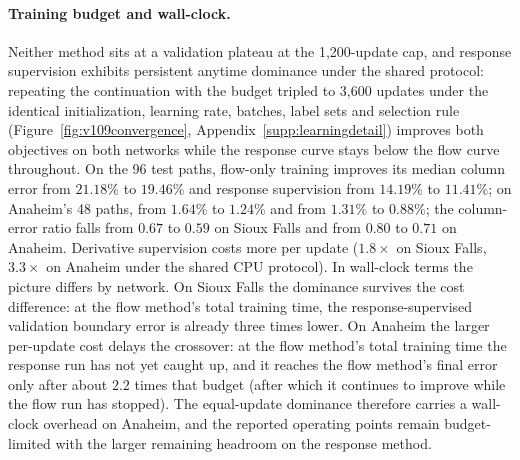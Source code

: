 \paragraph{Training budget and wall-clock.}
Neither method sits at a validation plateau at the 1{,}200-update cap,
and response supervision exhibits persistent anytime dominance under
the shared protocol: repeating the continuation with the budget
tripled to 3{,}600 updates under the identical initialization,
learning rate, batches, label sets and selection rule
(Figure~\ref{fig:v109convergence}, Appendix~\ref{supp:learningdetail})
improves both objectives on both networks while the response curve
stays below the flow curve throughout. On the 96 test paths, flow-only
training improves its median column error from $21.18\%$ to $19.46\%$
and response supervision from $14.19\%$ to $11.41\%$; on Anaheim's 48
paths, from $1.64\%$ to $1.24\%$ and from $1.31\%$ to $0.88\%$; the
column-error ratio falls from $0.67$ to $0.59$ on Sioux Falls and from
$0.80$ to $0.71$ on Anaheim. Derivative supervision costs more per
update ($1.8\times$ on Sioux Falls, $3.3\times$ on Anaheim under the
shared CPU protocol). In wall-clock terms the picture differs by
network. On Sioux Falls the dominance survives the cost difference: at
the flow method's total training time, the response-supervised
validation boundary error is already three times lower. On Anaheim the
larger per-update cost delays the crossover: at the flow method's
total training time the response run has not yet caught up, and it
reaches the flow method's final error only after about $2.2$ times
that budget (after which it continues to improve while the flow run
has stopped). The equal-update dominance therefore carries a
wall-clock overhead on Anaheim, and the reported operating points
remain budget-limited with the larger remaining headroom on the
response method.

